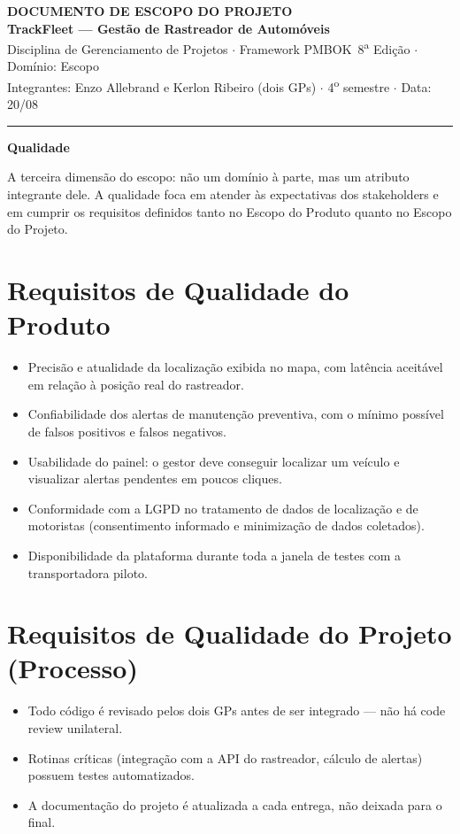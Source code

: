 \documentclass[11pt,a4paper]{article}
\begin{document}
\begin{center}
{\Large\bfseries DOCUMENTO DE ESCOPO DO PROJETO}\\[2pt]
{\large\bfseries TrackFleet --- Gestão de Rastreador de Automóveis}\\[4pt]
Disciplina de Gerenciamento de Projetos $\cdot$ Framework PMBOK\textregistered\ 8\textsuperscript{a} Edição $\cdot$ Domínio: Escopo\\[2pt]
Integrantes: Enzo Allebrand e Kerlon Ribeiro (dois GPs) $\cdot$ 4\textsuperscript{o} semestre $\cdot$ Data: 20/08
\end{center}

\vspace{2mm}
\hrule
\vspace{4mm}

\noindent\textbf{\large Qualidade}

\vspace{1mm}
\noindent A terceira dimensão do escopo: não um domínio à parte, mas um atributo integrante dele. A qualidade foca em atender às expectativas dos stakeholders e em cumprir os requisitos definidos tanto no Escopo do Produto quanto no Escopo do Projeto.

\section{Requisitos de Qualidade do Produto}
\begin{itemize}[itemsep=2pt]
  \item Precisão e atualidade da localização exibida no mapa, com latência aceitável em relação à posição real do rastreador.
  \item Confiabilidade dos alertas de manutenção preventiva, com o mínimo possível de falsos positivos e falsos negativos.
  \item Usabilidade do painel: o gestor deve conseguir localizar um veículo e visualizar alertas pendentes em poucos cliques.
  \item Conformidade com a LGPD no tratamento de dados de localização e de motoristas (consentimento informado e minimização de dados coletados).
  \item Disponibilidade da plataforma durante toda a janela de testes com a transportadora piloto.
\end{itemize}

\section{Requisitos de Qualidade do Projeto (Processo)}
\begin{itemize}[itemsep=2pt]
  \item Todo código é revisado pelos dois GPs antes de ser integrado --- não há code review unilateral.
  \item Rotinas críticas (integração com a API do rastreador, cálculo de alertas) possuem testes automatizados.
  \item A documentação do projeto é atualizada a cada entrega, não deixada para o final.
\end{itemize}
\end{document}

